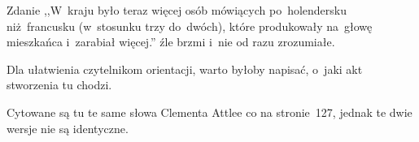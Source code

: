 \documentclass[a4paper,11pt]{article}
\begin{document}
\vspace{\spaceFour}


\start {} Zdanie ,,W~kraju było teraz więcej osób
mówiących po~holendersku niż~francusku (w~stosunku trzy do~dwóch),
które produkowały na~głowę mieszkańca i~zarabiał więcej.'' źle brzmi
i~nie od razu zrozumiałe.

\vspace{\spaceFour}


\start {} Dla ułatwienia czytelnikom
orientacji, warto byłoby napisać, o~jaki akt stworzenia tu chodzi.

\vspace{\spaceFour}


\start {} Cytowane są tu te same słowa
Clementa Attlee co na stronie~127, jednak te dwie wersje nie są
identyczne.



\nopagebreak
\end{document}
